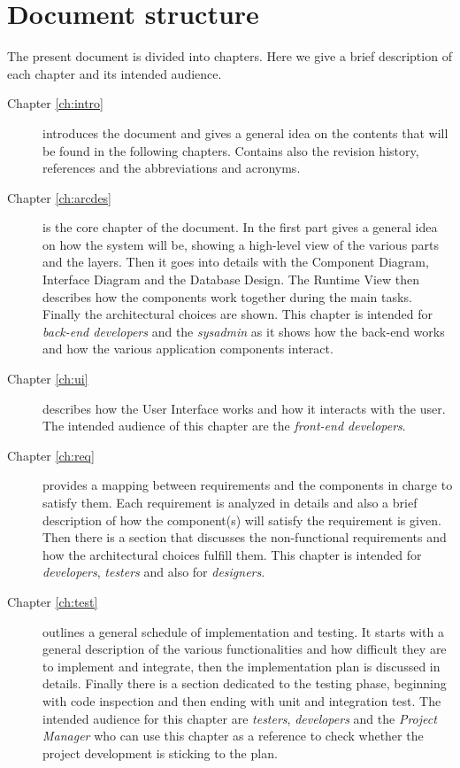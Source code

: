 \section{Document structure}
The present document is divided into chapters. Here we give a brief description
of each chapter and its intended audience.
\begin{description}
    \item[Chapter \ref{ch:intro}] introduces the document and gives a general
    idea on the contents that will be found in the following chapters. Contains
    also the revision history, references and the abbreviations and acronyms.
    \item[Chapter \ref{ch:arcdes}] is the core chapter of the document. In the
    first part gives a general idea on how the system will be, showing a
    high-level view of the various parts and the layers. Then it goes into
    details with the Component Diagram, Interface Diagram and the Database
    Design. The Runtime View then describes how the components work together
    during the main tasks. Finally the architectural choices
    are shown. This chapter is intended for \emph{back-end developers} and the
    \emph{sysadmin} as it shows how the back-end works and how the various
    application components interact.
    \item[Chapter \ref{ch:ui}] describes how the User Interface works and how it
    interacts with the user. The intended audience of this chapter are the
    \emph{front-end developers}.
    \item[Chapter \ref{ch:req}] provides a mapping between requirements and the
    components in charge to satisfy them. Each requirement is analyzed in
    details and also a brief description of how the component(s) will satisfy
    the requirement is given. Then there is a section that discusses the
    non-functional requirements and how the architectural choices fulfill them.
    This chapter is intended for \emph{developers}, \emph{testers} and also for
    \emph{designers}.
    \item[Chapter \ref{ch:test}] outlines a general schedule of implementation
    and testing. It starts with a general description of the various
    functionalities and how difficult they are to implement and integrate, then
    the implementation plan is discussed in details. Finally there is a section
    dedicated to the testing phase, beginning with code inspection and then
    ending with unit and integration test. The intended audience for this
    chapter are \emph{testers}, \emph{developers} and the \emph{Project Manager}
    who can use this chapter as a reference to check whether the project
    development is sticking to the plan.
\end{description}
